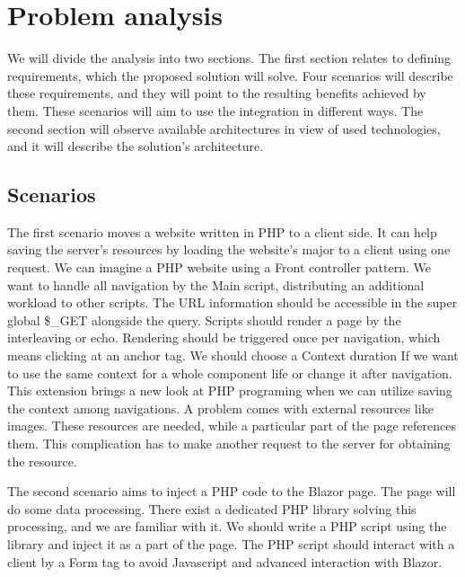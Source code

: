 \chapter{Problem analysis}
We will divide the analysis into two sections.
The first section relates to defining requirements, which the proposed solution will solve.
Four scenarios will describe these requirements, and they will point to the resulting benefits achieved by them.
These scenarios will aim to use the integration in different ways.
The second section will observe available architectures in view of used technologies, and it will describe the solution's architecture.

\section{Scenarios}
The first scenario moves a website written in PHP to a client side.
It can help saving the server's resources by loading the website's major to a client using one request.
We can imagine a PHP website using a Front controller pattern.
We want to handle all navigation by the Main script, distributing an additional workload to other scripts.
The URL information should be accessible in the super global \$\_GET alongside the query.
Scripts should render a page by the interleaving or echo.
Rendering should be triggered once per navigation, which means clicking at an anchor tag.
We should choose a Context duration If we want to use the same context for a whole component life or change it after navigation.
This extension brings a new look at PHP programing when we can utilize saving the context among navigations.
A problem comes with external resources like images.
These resources are needed, while a particular part of the page references them.
This complication has to make another request to the server for obtaining the resource.
\par
The second scenario aims to inject a PHP code to the Blazor page.
The page will do some data processing.
There exist a dedicated PHP library solving this processing, and we are familiar with it.
We should write a PHP script using the library and inject it as a part of the page.
The PHP script should interact with a client by a Form tag to avoid Javascript and advanced interaction with Blazor.
